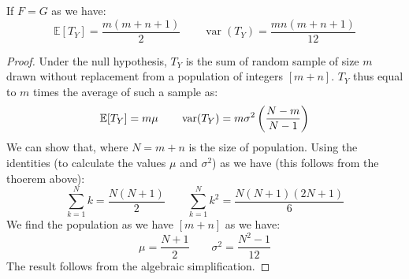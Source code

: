 \begin{proposition}
    If $F = G$ as we have:
    \begin{equation*}
        \mathbb{E}[T_Y] = \frac{m(m+n+1)}{2} \qquad \operatorname{var}(T_Y) = \frac{mn(m+n+1)}{12}
    \end{equation*}
\end{proposition}
\begin{proof}
    Under the null hypothesis, $T_Y$ is the sum of random sample of size $m$ drawn without replacement from a population of integers $[m+n]$. $T_Y$ thus equal to $m$ times the average of such a sample as:
    \begin{equation*}
        \mathbb{E}[T_Y] = m\mu \qquad \operatorname{var}(T_Y) = m\sigma^2\left( \frac{N-m}{N-1} \right)
    \end{equation*}
    We can show that, where $N = m+n$ is the size of population. Using the identities (to calculate the values $\mu$ and $\sigma^2$) as we have (this follows from the thoerem above):
    \begin{equation*}
        \sum^N_{k=1} k = \frac{N(N+1)}{2} \qquad \sum^N_{k=1}k^2 = \frac{N(N+1)(2N+1)}{6}
    \end{equation*}
    We find the population as we have $[m +n]$ as we have:
    \begin{equation*}
        \mu = \frac{N+1}{2} \qquad \sigma^2 = \frac{N^2-1}{12} 
    \end{equation*}
    The result follows from the algebraic simplification.
\end{proof}

